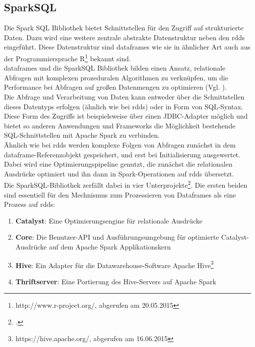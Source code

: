 \subsection{SparkSQL}
Die Spark SQL Bibliothek bietet Schnittstellen für den Zugriff auf strukturierte Daten. Dazu wird eine weitere zentrale abstrakte Datenstruktur neben den \glspl{rdd} eingeführt. Diese Datenstruktur sind \glspl{dataframe} wie sie in ähnlicher Art auch aus der Programmiersprache R\footnote{http://www.r-project.org/, abgerufen am 20.05.2015} bekannt sind.\\

\Glspl{dataframe} und die SparkSQL Bibliothek bilden einen Ansatz, relationale Abfragen mit komplexen prozeduralen Algorithmen zu verknüpfen, um die Performance bei Abfragen auf großen Datenmengen zu optimieren (Vgl. \cite{Armbrust:2015:SSR:2723372.2742797}).\\

Die Abfrage und Verarbeitung von Daten kann entweder über die Schnittstellen dieses Datentyps erfolgen (ähnlich wie bei \glspl{rdd}) oder in Form von SQL-Syntax.\\

Diese Form des Zugriffs ist beispielsweise über einen JDBC-Adapter möglich und bietet so anderen Anwendungen und Frameworks die Möglichkeit bestehende SQL-Schnittstellen mit Apache Spark zu verbinden.\\

Ähnlich wie bei \glspl{rdd} werden komplexe Folgen von Abfragen zunächst in dem \gls{dataframe}-Referenzobjekt gespeichert, und erst bei Initialisierung ausgewertet. Dabei wird eine Optimierungspipeline genutzt, die zunächst die relationalen Ausdrücke optimiert und ihn dann in Spark-Operationen auf \glspl{rdd} übersetzt.\\

Die SparkSQL-Bibliothek zerfällt dabei in vier Unterprojekte\footcite{https://github.com/apache/spark/tree/branch-1.3/sql, abgerufen am 16.06.2015}. Die ersten beiden sind essentiell für den Mechnismus zum Prozessieren von Dataframes als eine Prozess auf \glspl{rdd}:
\begin{enumerate}
	\item \textbf{Catalyst}: Eine Optimierungsengine für relationale Ausdrücke
	\item \textbf{Core}: Die Benutzer-API und Ausführungsumgebung für optimierte Catalyst-Ausdrücke auf dem Apache Spark Applikationskern
	\item \textbf{Hive}: Ein Adapter für die Datawarehouse-Software Apache Hive\footnote{https://hive.apache.org/, abgerufen am 16.06.2015}
	\item \textbf{Thriftserver}: Eine Portierung des Hive-Servers auf Apache Spark
\end{enumerate}

